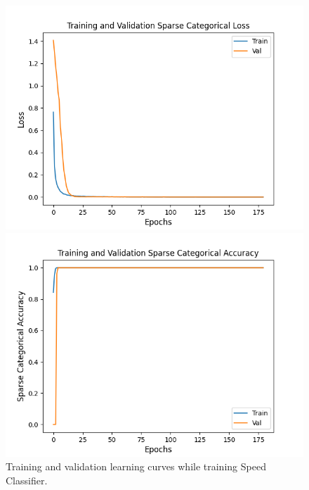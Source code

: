 \documentclass[
  manuscript=report,  %
  layout=preprint,  %
  year=20xx,
  volume=x,
]{extra/joas}
\begin{document}
\begin{figure}[ht!]
  \centering
  \begin{minipage}[b]{0.48\textwidth}
    \includegraphics[width=\textwidth]{figures/speedClassifierTrainingAndValidationLoss.png}
    \caption{Training and validation learning curves while training Speed Classifier.}
    \label{fig:speedClassifierTrainingAndValidationLossAccuracy}
  \end{minipage}
  \begin{minipage}[b]{0.48\textwidth}
    \includegraphics[width=\textwidth]{figures/speedClassifierTrainingAndValidationAccuracy.png}
  \end{minipage}
\end{figure}
\end{document}
